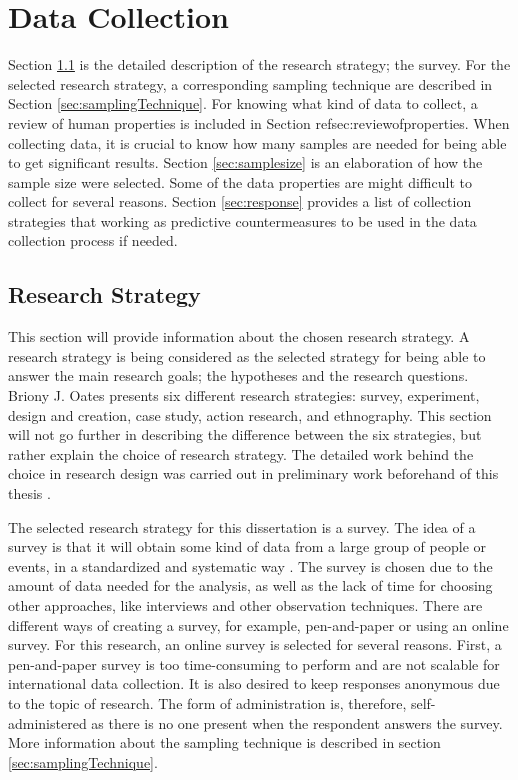 \chapter{Data Collection}\label{chap:experiment}
  
  Section \ref{sec:researchStrategy} is the detailed description of the research strategy; the survey. For the selected research strategy, a corresponding sampling technique are described in Section \ref{sec:samplingTechnique}. For knowing what kind of data to collect, a review of human properties is included in Section ref{sec:reviewofproperties}. When collecting data, it is crucial to know how many samples are needed for being able to get significant results. Section \ref{sec:samplesize} is an elaboration of how the sample size were selected. Some of the data properties are might difficult to collect for several reasons. Section \ref{sec:response} provides a list of collection strategies that working as predictive countermeasures to be used in the data collection process if needed. 

  \clearpage
  \section{Research Strategy}\label{sec:researchStrategy}
    This section will provide information about the chosen research strategy. A research strategy is being considered as the selected strategy for being able to answer the main research goals; the hypotheses and the research questions. Briony J. Oates \cite{empiriske} presents six different research strategies: survey, experiment, design and creation, case study, action research, and ethnography. This section will not go further in describing the difference between the six strategies, but rather explain the choice of research strategy. The detailed work behind the choice in research design was carried out in preliminary work beforehand of this thesis \cite{prosjektoppgave}.

    The selected research strategy for this dissertation is a survey. The idea of a survey is that it will obtain some kind of data from a large group of people or events, in a standardized and systematic way \cite{empiriske}. The survey is chosen due to the amount of data needed for the analysis, as well as the lack of time for choosing other approaches, like interviews and other observation techniques. There are different ways of creating a survey, for example, pen-and-paper or using an online survey. For this research, an online survey is selected for several reasons. First, a pen-and-paper survey is too time-consuming to perform and are not scalable for international data collection. It is also desired to keep responses anonymous due to the topic of research. The form of administration is, therefore, self-administered as there is no one present when the respondent answers the survey. More information about the sampling technique is described in section \ref{sec:samplingTechnique}.

